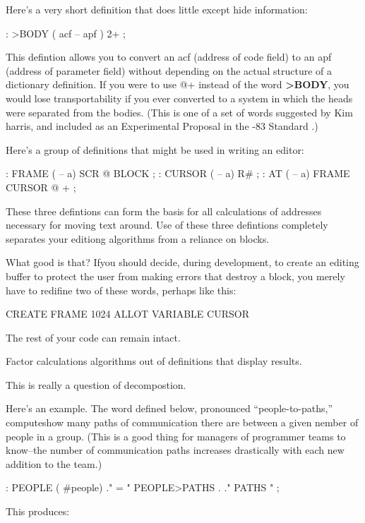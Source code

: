 Here's a very short definition that does little except hide information:

\begin{Code}
: >BODY  ( acf -- apf )  2+ ;
\end{Code}


\noindent
This defintion allows you to convert an acf (address of code field) to an apf (address of parameter field) without depending on the actual structure of a dictionary definition. If you were to use @+ instead of the word \textbf{>BODY}, you would lose transportability if you ever converted to a \Forth{} system in which the heads were separated from the bodies. (This is one of a set of words suggested by Kim harris, and included as an Experimental Proposal in the \Forth{}-83 Standard \cite{harris83}.)

Here's a group of definitions that might be used in writing an editor:

\begin{Code}
: FRAME  ( -- a)  SCR @ BLOCK ;
: CURSOR  ( -- a)  R# ;
: AT  ( -- a)  FRAME  CURSOR @ + ;
\end{Code}
These three defintions can form the basis for all calculations of addresses necessary for moving text around. Use of these three defintions completely separates your editiong algorithms from a reliance on \Forth{} blocks.

What good is that? Ifyou should decide, during development, to create an editing buffer to protect the user from making errors that destroy a block, you merely have to redifine two of these words, perhaps like this:

\begin{Code}
CREATE FRAME  1024 ALLOT
VARIABLE CURSOR
\end{Code}
The rest of your code can remain intact. 

\begin{tip}
Factor calculations algorithms out of definitions that display results.
\end{tip}
This is really a question of decompostion.

Here's an example. The word defined below, pronounced ``people-to-paths,'' computeshow many paths of communication there are between a given nember of people in a group. (This is a good thing for managers of programmer teams to know--the number of communication paths increases drastically with each new addition to the team.)

\begin{Code}
: PEOPLE  ( #people)
    ." = "  PEOPLE>PATHS  .  ." PATHS " ;
\end{Code}
This produces:

